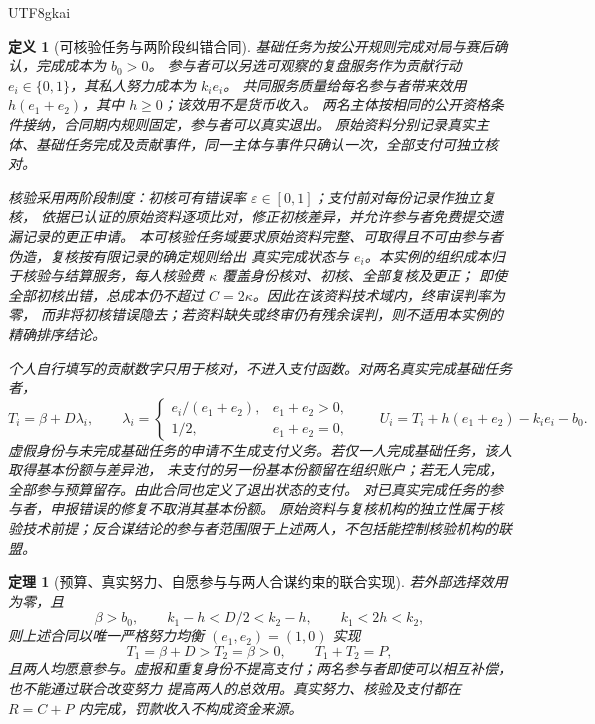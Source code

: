\documentclass[12pt,a4paper,openany]{report}
\newtheorem{definition}{定义}[chapter]
\newtheorem{theorem}{定理}[chapter]
\begin{document}
\begin{CJK*}{UTF8}{gkai}
\begin{definition}[可核验任务与两阶段纠错合同]
\label{def:audited-effort-contract}
基础任务为按公开规则完成对局与赛后确认，完成成本为 \(b_0>0\)。
参与者可以另选可观察的复盘服务作为贡献行动 \(e_i\in\{0,1\}\)，其私人努力成本为 \(k_i e_i\)。
共同服务质量给每名参与者带来效用 \(h(e_1+e_2)\)，其中 \(h\ge0\)；该效用不是货币收入。
两名主体按相同的公开资格条件接纳，合同期内规则固定，参与者可以真实退出。
原始资料分别记录真实主体、基础任务完成及贡献事件，同一主体与事件只确认一次，全部支付可独立核对。

核验采用两阶段制度：初核可有错误率 \(\varepsilon\in[0,1]\)；支付前对每份记录作独立复核，
依据已认证的原始资料逐项比对，修正初核差异，并允许参与者免费提交遗漏记录的更正申请。
本可核验任务域要求原始资料完整、可取得且不可由参与者伪造，复核按有限记录的确定规则给出
真实完成状态与 \(e_i\)。本实例的组织成本归于核验与结算服务，每人核验费 \(\kappa\) 覆盖身份核对、初核、全部复核及更正；
即使全部初核出错，总成本仍不超过 \(C=2\kappa\)。因此在该资料技术域内，终审误判率为零，
而非将初核错误隐去；若资料缺失或终审仍有残余误判，则不适用本实例的精确排序结论。

个人自行填写的贡献数字只用于核对，不进入支付函数。对两名真实完成基础任务者，
\[
 T_i=\beta+D\lambda_i,\qquad
 \lambda_i=
 \begin{cases}
 e_i/(e_1+e_2),&e_1+e_2>0,\\
 1/2,&e_1+e_2=0,
 \end{cases}
 \qquad
 U_i=T_i+h(e_1+e_2)-k_ie_i-b_0.
\]
虚假身份与未完成基础任务的申请不生成支付义务。若仅一人完成基础任务，该人取得基本份额与差异池，
未支付的另一份基本份额留在组织账户；若无人完成，全部参与预算留存。由此合同也定义了退出状态的支付。
对已真实完成任务的参与者，申报错误的修复不取消其基本份额。
原始资料与复核机构的独立性属于核验技术前提；反合谋结论的参与者范围限于上述两人，不包括能控制核验机构的联盟。
\end{definition}

\begin{theorem}[预算、真实努力、自愿参与与两人合谋约束的联合实现]
\label{thm:audited-effort-implementation}
若外部选择效用为零，且
\[
 \beta>b_0,\qquad
 k_1-h<D/2<k_2-h,\qquad
 k_1<2h<k_2,
\]
则上述合同以唯一严格努力均衡 \((e_1,e_2)=(1,0)\) 实现
\[
 T_1=\beta+D>T_2=\beta>0,\qquad T_1+T_2=P,
\]
且两人均愿意参与。虚报和重复身份不提高支付；两名参与者即使可以相互补偿，也不能通过联合改变努力
提高两人的总效用。真实努力、核验及支付都在 \(R=C+P\) 内完成，罚款收入不构成资金来源。
\end{theorem}


\end{CJK*}
\end{document}

